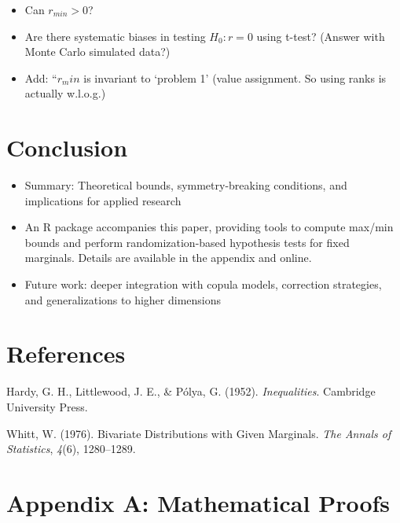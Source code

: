 \documentclass[
  12pt,
]{article}
\providecommand{\tightlist}{%
  \setlength{\itemsep}{0pt}\setlength{\parskip}{0pt}}\usepackage{longtable,booktabs,array}
\newlength{\cslhangindent}
\newenvironment{CSLReferences}[2] %
 {\begin{list}{}{%
  \setlength{\itemindent}{0pt}
  \setlength{\leftmargin}{0pt}
  \setlength{\parsep}{0pt}
  \ifodd #1
   \setlength{\leftmargin}{\cslhangindent}
   \setlength{\itemindent}{-1\cslhangindent}
  \fi
  \setlength{\itemsep}{#2\baselineskip}}}
 {\end{list}}
\theoremstyle{plain}
\theoremstyle{definition}
\theoremstyle{remark}
\begin{document}
\begin{itemize}
\tightlist
\item
  Can \(r_{min} >0\)?
\item
  Are there systematic biases in testing \(H_0: r=0\) using t-test?
  (Answer with Monte Carlo simulated data?)
\item
  Add: ``\(r_min\) is invariant to `problem 1' (value assignment. So
  using ranks is actually w.l.o.g.)
\end{itemize}

\section{Conclusion}\label{conclusion}

\begin{itemize}
\tightlist
\item
  Summary: Theoretical bounds, symmetry-breaking conditions, and
  implications for applied research
\item
  An R package accompanies this paper, providing tools to compute
  max/min bounds and perform randomization-based hypothesis tests for
  fixed marginals. Details are available in the appendix and online.
\item
  Future work: deeper integration with copula models, correction
  strategies, and generalizations to higher dimensions
\end{itemize}

\newpage

\section{References}\label{references}

\label{refs}
\begin{CSLReferences}{1}{0}
Hardy, G. H., Littlewood, J. E., \& Pólya, G. (1952).
\emph{Inequalities}. Cambridge University Press.

Whitt, W. (1976). Bivariate {Distributions} with {Given Marginals}.
\emph{The Annals of Statistics}, \emph{4}(6), 1280--1289.

\end{CSLReferences}

\newpage

\appendix

\section{Appendix A: Mathematical
Proofs}\label{appendix-a-mathematical-proofs}
\end{document}
